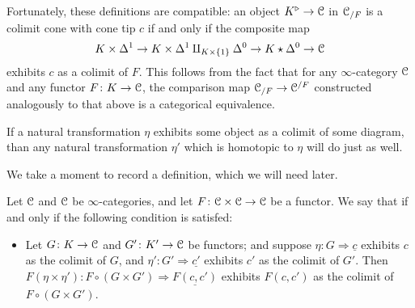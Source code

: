 \documentclass[main.tex]{subfiles}
\begin{document}
Fortunately, these definitions are compatible: an object $K^{\triangleright} \to \mathcal{C}$ in $\mathcal{C}_{/F}$ is a colimit cone with cone tip $c$ if and only if the composite map
\begin{equation}
  \label{eq:natural_transformation_from_colimit_cone}
  K \times \Delta^{1} \to K \times \Delta^{1} \amalg_{K \times \{1\}} \Delta^{0} \to K \star \Delta^{0} \to \mathcal{C}
\end{equation}
exhibits $c$ as a colimit of $F$. This follows from the fact that for any $\infty$-category $\mathcal{C}$ and any functor $F\colon K \to \mathcal{C}$, the comparison map $\mathcal{C}_{/F} \to \mathcal{C}^{/F}$ constructed analogously to that above is a categorical equivalence.

\begin{note}
  If a natural transformation $\eta$ exhibits some object as a colimit of some diagram, than any natural transformation $\eta'$ which is homotopic to $\eta$ will do just as well.
\end{note}

We take a moment to record a definition, which we will need later.

\begin{definition}
  \label{def:preserve_colimits_in_each_slot}
  Let $\mathcal{C}$ and $\mathcal{C}$ be $\infty$-categories, and let $F\colon \mathcal{C} \times \mathcal{C} \to \mathcal{C}$ be a functor. We say that  if and only if the following condition is satisfed:
  \begin{itemize}
    \item Let $G\colon K \to \mathcal{C}$ and $G'\colon K' \to \mathcal{C}$ be functors; and suppose $\eta\colon G \Rightarrow \underline{c}$ exhibits $c$ as the colimit of $G$, and $\eta'\colon G' \Rightarrow \underline{c'}$ exhibits $c'$ as the colimit of $G'$. Then $F(\eta \times \eta')\colon F \circ (G \times G') \Rightarrow \underline{F(c, c')}$ exhibits $F(c, c')$ as the colimit of $F \circ (G \times G')$.
  \end{itemize}
\end{definition}
\end{document}
